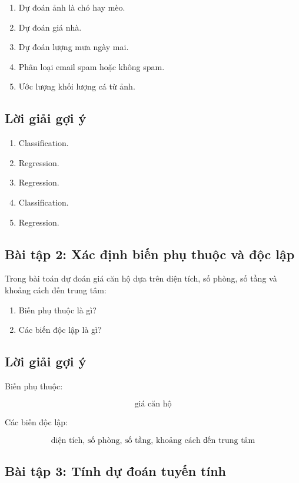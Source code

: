 \begin{enumerate}
    \item Dự đoán ảnh là chó hay mèo.
    \item Dự đoán giá nhà.
    \item Dự đoán lượng mưa ngày mai.
    \item Phân loại email spam hoặc không spam.
    \item Ước lượng khối lượng cá từ ảnh.
\end{enumerate}

\subsection*{Lời giải gợi ý}

\begin{enumerate}
    \item Classification.
    \item Regression.
    \item Regression.
    \item Classification.
    \item Regression.
\end{enumerate}

\subsection*{Bài tập 2: Xác định biến phụ thuộc và độc lập}

Trong bài toán dự đoán giá căn hộ dựa trên diện tích, số phòng, số tầng và khoảng cách đến trung tâm:

\begin{enumerate}
    \item Biến phụ thuộc là gì?
    \item Các biến độc lập là gì?
\end{enumerate}

\subsection*{Lời giải gợi ý}

Biến phụ thuộc:

\[
    \text{giá căn hộ}
\]

Các biến độc lập:

\[
    \text{diện tích, số phòng, số tầng, khoảng cách đến trung tâm}
\]

\subsection*{Bài tập 3: Tính dự đoán tuyến tính}

